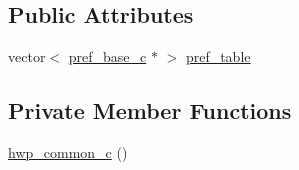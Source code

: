 \subsection*{Public Attributes}
\begin{DoxyCompactItemize}
\item 
vector$<$ \hyperlink{classpref__base__c}{pref\_\-base\_\-c} $\ast$ $>$ \hyperlink{classhwp__common__c_aaad4b27dd21568522b666a86f953a6f3}{pref\_\-table}
\end{DoxyCompactItemize}
\subsection*{Private Member Functions}
\begin{DoxyCompactItemize}
\item 
\hyperlink{classhwp__common__c_a847af22e1e6b5cd521682e222931e215}{hwp\_\-common\_\-c} ()
\end{DoxyCompactItemize}
